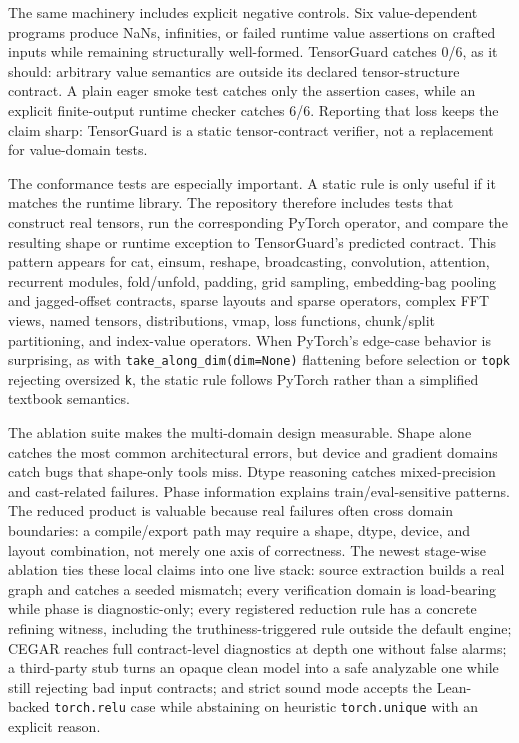 \documentclass[11pt]{article}
\newcommand{\tg}{TensorGuard}
\begin{document}
The same machinery includes explicit negative controls.  Six value-dependent
programs produce NaNs, infinities, or failed runtime value assertions on crafted
inputs while remaining structurally well-formed.  \tg{} catches 0/6, as it
should: arbitrary value semantics are outside its declared tensor-structure
contract.  A plain eager smoke test catches only the assertion cases, while an
explicit finite-output runtime checker catches 6/6.  Reporting that loss keeps
the claim sharp: \tg{} is a static tensor-contract verifier, not a replacement
for value-domain tests.

The conformance tests are especially important.  A static rule is only useful
if it matches the runtime library.  The repository therefore includes tests
that construct real tensors, run the corresponding PyTorch operator, and compare
the resulting shape or runtime exception to \tg{}'s predicted contract.  This
pattern appears for cat, einsum, reshape, broadcasting, convolution, attention,
recurrent modules, fold/unfold, padding, grid sampling, embedding-bag
pooling and jagged-offset contracts, sparse layouts and sparse operators, complex
FFT views, named tensors, distributions, vmap, loss functions, chunk/split
partitioning, and index-value operators.  When PyTorch's
edge-case behavior is surprising, as with \texttt{take\_along\_dim(dim=None)}
flattening before selection or \texttt{topk} rejecting oversized \texttt{k}, the
static rule follows PyTorch rather than a simplified textbook semantics.

The ablation suite makes the multi-domain design measurable.  Shape alone
catches the most common architectural errors, but device and gradient domains
catch bugs that shape-only tools miss.  Dtype reasoning catches mixed-precision
and cast-related failures.  Phase information explains train/eval-sensitive
patterns.  The reduced product is valuable because real failures often cross
domain boundaries: a compile/export path may require a shape, dtype, device,
and layout combination, not merely one axis of correctness.
The newest stage-wise ablation ties these local claims into one live stack:
source extraction builds a real graph and catches a seeded mismatch; every
verification domain is load-bearing while phase is diagnostic-only; every
registered reduction rule has a concrete refining witness, including the
truthiness-triggered rule outside the default engine; CEGAR reaches full
contract-level diagnostics at depth one without false alarms; a third-party stub
turns an opaque clean model into a safe analyzable one while still rejecting bad
input contracts; and strict sound mode accepts the Lean-backed \texttt{torch.relu}
case while abstaining on heuristic \texttt{torch.unique} with an explicit reason.
\end{document}
